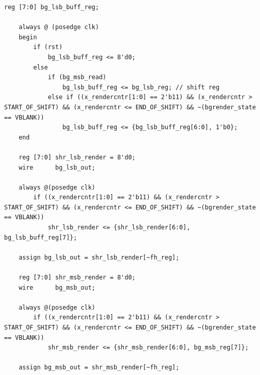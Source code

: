 	\begin{lstlisting}[style=prettyverilog]
	reg [7:0] bg_lsb_buff_reg;
	
	always @ (posedge clk) 
	begin
		if (rst)
			bg_lsb_buff_reg <= 8'd0;
		else
			if (bg_msb_read)
				bg_lsb_buff_reg <= bg_lsb_reg; // shift reg
			else if ((x_rendercntr[1:0] == 2'b11) && (x_rendercntr > START_OF_SHIFT) && (x_rendercntr <= END_OF_SHIFT) && ~(bgrender_state == VBLANK))
				bg_lsb_buff_reg <= {bg_lsb_buff_reg[6:0], 1'b0}; 
	end
	
	reg [7:0] shr_lsb_render = 8'd0;
	wire	  bg_lsb_out;  
	
	always @(posedge clk) 
		if ((x_rendercntr[1:0] == 2'b11) && (x_rendercntr > START_OF_SHIFT) && (x_rendercntr <= END_OF_SHIFT) && ~(bgrender_state == VBLANK))
			shr_lsb_render <= {shr_lsb_render[6:0], bg_lsb_buff_reg[7]};
	
	assign bg_lsb_out = shr_lsb_render[~fh_reg];
	
	reg [7:0] shr_msb_render = 8'd0;
	wire	  bg_msb_out;  
	
	always @(posedge clk) 
		if ((x_rendercntr[1:0] == 2'b11) && (x_rendercntr > START_OF_SHIFT) && (x_rendercntr <= END_OF_SHIFT) && ~(bgrender_state == VBLANK))
			shr_msb_render <= {shr_msb_render[6:0], bg_msb_reg[7]};
	
	assign bg_msb_out = shr_msb_render[~fh_reg];\end{lstlisting}

